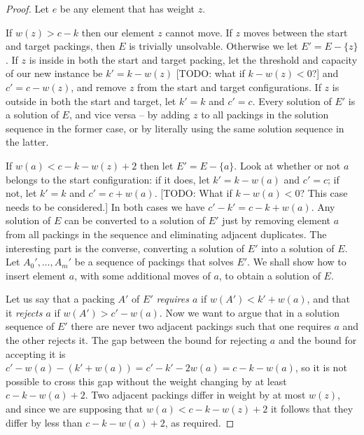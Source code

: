 \documentclass{robinminion}
\begin{document}
\begin{proof}
    Let $e$ be any element that has weight $z$.
    
    If $w(z) > c - k$ then our element $z$ cannot move. If $z$ moves between the start and target packings, then $E$ is trivially unsolvable. Otherwise we let $E' = E-\{z\}$. If $z$ is inside in both the start and target packing, let the threshold and capacity of our new instance be $k' = k-w(z)$ [TODO: what if $k-w(z) < 0$?] and $c' = c-w(z)$, and remove $z$ from the start and target configurations. If $z$ is outside in both the start and target, let $k'=k$ and $c'=c$. Every solution of $E'$ is a solution of $E$, and vice versa -- by adding $z$ to all packings in the solution sequence in the former case, or by literally using the same solution sequence in the latter.
    
    If $w(a) < c-k-w(z) + 2$ then let $E' = E-\{a\}$. Look at whether or not $a$ belongs to the start configuration: if it does, let $k'=k-w(a)$ and $c'=c$; if not, let $k'=k$ and $c'=c+w(a)$. [TODO: What if $k-w(a) < 0$? This case needs to be considered.] In both cases we have $c'-k' = c-k+w(a)$. Any solution of $E$ can be converted to a solution of $E'$ just by removing element $a$ from all packings in the sequence and eliminating adjacent duplicates. The interesting part is the converse, converting a solution of $E'$ into a solution of $E$. Let $A_0', \dots, A_m'$ be a sequence of packings that solves $E'$. We shall show how to insert element $a$, with some additional moves of $a$, to obtain a solution of $E$.
    
    Let us say that a packing $A'$ of $E'$ \textit{requires $a$} if $w(A') < k' + w(a)$, and that it \textit{rejects $a$} if $w(A') > c' - w(a)$. Now we want to argue that in a solution sequence of $E'$ there are never two adjacent packings such that one requires $a$ and the other rejects it. The gap between the bound for rejecting $a$ and the bound for accepting it is $c' - w(a) - (k' + w(a)) = c'-k'-2w(a) = c-k-w(a)$, so it is not possible to cross this gap without the weight changing by at least $c-k-w(a)+2$. Two adjacent packings differ in weight by at most $w(z)$, and since we are supposing that $w(a) < c-k-w(z) + 2$ it follows that they differ by less than $c-k-w(a)+2$, as required.
    

\end{proof}
\end{document}
